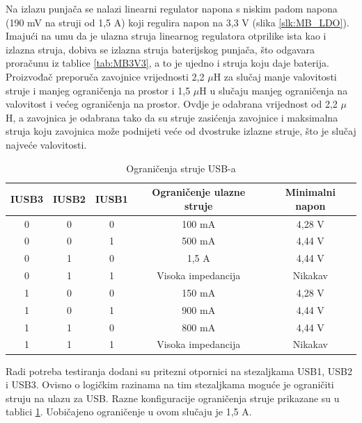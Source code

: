 Na izlazu punjača se nalazi linearni regulator napona s niskim padom napona (190 mV na struji od 1,5 A) koji regulira napon na 3,3 V (slika \ref{slk:MB_LDO}). Imajući na umu da je ulazna struja linearnog regulatora otprilike ista kao i izlazna struja, dobiva se izlazna struja baterijskog punjača, što odgavara proračunu iz tablice \ref{tab:MB3V3}, a to je ujedno i struja koju daje baterija. Proizvođač preporuča zavojnice vrijednosti 2,2 $\mu$H za slučaj manje valovitosti struje i manjeg ograničenja na prostor i 1,5 $\mu$H u slučaju manjeg ograničenja na valovitost i većeg ograničenja na prostor. Ovdje je odabrana vrijednost od 2,2 $\mu$H, a zavojnica je odabrana tako da su struje zasićenja zavojnice i maksimalna struja koju zavojnica može podnijeti veće od dvostruke izlazne struje, što je slučaj najveće valovitosti.
\begin{table}[!htb]
    \centering
    \caption{Ograničenja struje USB-a \cite{ti:bq24166}}
    \begin{tabular}{|c|c|c|c|c|} \hline
    IUSB3 & IUSB2 & IUSB1 & Ograničenje ulazne struje & Minimalni napon \\
    \hline
    0 & 0 & 0 & 100 mA & 4,28 V \\
    \hline
    0 & 0 & 1 & 500 mA & 4,44 V \\
    \hline
    0 & 1 & 0 & 1,5 A & 4,44 V \\
    \hline
    0 & 1 & 1 & Visoka impedancija & Nikakav \\
    \hline
    1 & 0 & 0 & 150 mA & 4,28 V \\
    \hline
    1 & 0 & 1 & 900 mA & 4,44 V \\
    \hline
    1 & 1 & 0 & 800 mA & 4,44 V \\
    \hline
    1 & 1 & 1 & Visoka impedancija & Nikakav \\
    \hline
    \end{tabular}%
    \label{tab:USB_ILIM}%
\end{table}%

Radi potreba testiranja dodani su pritezni otpornici na stezaljkama USB1, USB2 i USB3. Ovisno o logičkim razinama na tim stezaljkama moguće je ograničiti struju na ulazu za USB. Razne konfiguracije ograničenja struje prikazane su u tablici \ref{tab:USB_ILIM}. Uobičajeno ograničenje u ovom slučaju je 1,5 A.


